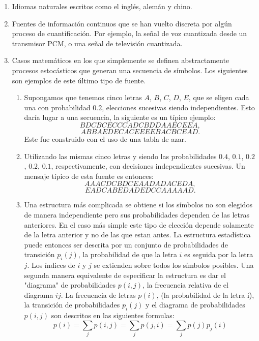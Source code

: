 \begin{enumerate}
\item Idiomas naturales escritos como el ingl\'es, alem\'an y chino.
\item Fuentes de informaci\'on continuos que se han vuelto discreta por alg\'un proceso 
de cuantificaci\'on. Por ejemplo, la se\~nal de voz cuantizada desde
un transmisor PCM, o una se\~nal de televisi\'on cuantizada.
\item Casos matem\'aticos en los que simplemente se definen abstractamente procesos estoc\'asticos 
que generan una secuencia de s\'imbolos. Los siguientes son ejemplos
de este \'ultimo tipo de fuente.
\begin{enumerate}
\item Supongamos que tenemos cinco letras $A$, $B$, $C$, $D$, $E$, que se eligen cada una con probabilidad $0.2$, 
elecciones sucesivas siendo independientes. Esto dar\'ia lugar a una
secuencia, la siguiente es un t\'ipico ejemplo:
$$B D C B C E C C C A D C B D D A A E C E E A,$$
$$A B B A E D E C A C E E E E B A C B C E A D.$$
Este fue construido con el uso de una tabla de azar.
\item Utilizando las mismas cinco letras y siendo las probabilidades $0.4$, 
$0.1$, $0.2$, $0.2$, $0.1$, respectivamente, con decisiones independientes
sucesivas. Un mensaje t\'ipico de esta fuente es entonces:
$$A A A C D C B D C E A A D A D A C E D A,$$
$$E A D C A B E D A D E D C C A A A A A D.$$
\item Una estructura m\'as complicada se obtiene si los s\'imbolos no son elegidos 
de manera independiente pero sus probabilidades dependen de las letras
anteriores. En el caso m\'as simple este tipo de elecci\'on depende
solamente de la letra anterior y no de las que estan antes. La
estructura estad\'istica puede entonces ser descrita por un conjunto
de probabilidades de transici\'on $p_{i}(j)$, la probabilidad de que
la letra $i$ es seguida por la letra $j$. Los \'indices de $i$ y $j$
se extienden sobre todos los s\'imbolos posibles. Una segunda manera
equivalente de especificar la estructura es dar el "diagrama" de
probabilidades $p(i,j)$, la frecuencia relativa de el diagrama $i j$.
La frecuencia de letras $p(i)$, (la probabilidad de la letra i), la
transici\'on de probabilidades $p_{i}(j)$ y el diagrama de
probabilidades $p(i,j)$ son descritos en las siguientes formulas:
\begin{equation}
p(i)=\sum_{j}p(i,j)=\sum_{j}p(j,i)=\sum_{j}p(j)p_{j}(i) 
\end{equation}
\end{enumerate}
\end{enumerate}
